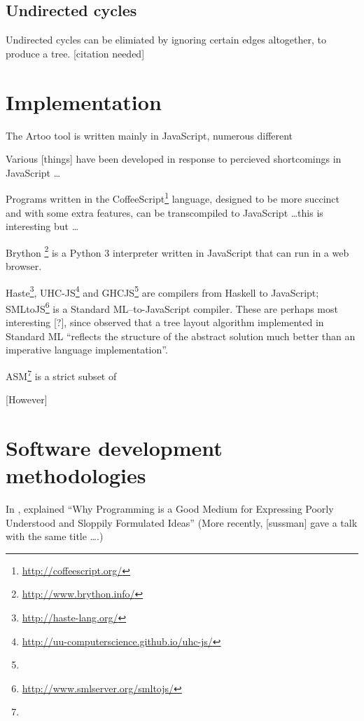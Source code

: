 \subsection{Undirected cycles}

Undirected cycles can be elimiated by ignoring certain edges altogether, to produce a tree.  [citation needed]








\section{Implementation}

The Artoo tool is written mainly in JavaScript, numerous different 

Various [things] have been developed in response to percieved shortcomings in JavaScript \ldots

Programs written in the CoffeeScript\footnote{\url{http://coffeescript.org/}} language, designed to be more succinct and with some extra features, can be transcompiled to JavaScript \ldots this is interesting but \ldots

Brython \footnote{\url{http://www.brython.info/}} is a Python 3 interpreter written in JavaScript that can run in a web browser. 

Haste\footnote{\url{http://haste-lang.org/}}, UHC-JS\footnote{\url{http://uu-computerscience.github.io/uhc-js/}} and GHCJS\footnote{} are compilers from Haskell to JavaScript; SMLtoJS\footnote{\url{http://www.smlserver.org/smltojs/}} is a Standard ML--to-JavaScript compiler. These are perhaps most interesting [?], since \citet{kennedyfuntrees} observed that a tree layout algorithm implemented in Standard ML ``reflects the structure of the abstract solution much better than an imperative language implementation''.



ASM\footnote{} is a strict subset of 

[However]


\section{Software development methodologies}

In \citeyear{67poorslop}, \citet*{67poorslop} explained ``Why Programming is a Good Medium for Expressing Poorly Understood and Sloppily Formulated Ideas''
(More recently, [sussman] gave a talk with the same title \ldots {}.)

